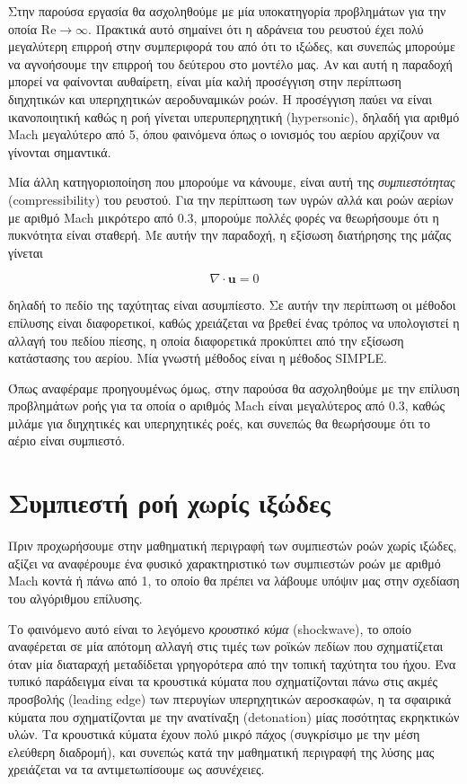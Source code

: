 Στην παρούσα εργασία θα ασχοληθούμε με μία υποκατηγορία προβλημάτων για την οποία $\mathrm{Re} \to \infty$.
Πρακτικά αυτό σημαίνει ότι η αδράνεια του ρευστού έχει πολύ μεγαλύτερη επιρροή στην συμπεριφορά του από ότι το ιξώδες, και συνεπώς μπορούμε να αγνοήσουμε την επιρροή του δεύτερου στο μοντέλο μας.
Αν και αυτή η παραδοχή μπορεί να φαίνονται αυθαίρετη, είναι μία καλή προσέγγιση στην περίπτωση διηχητικών και υπερηχητικών αεροδυναμικών ροών.
Η προσέγγιση παύει να είναι ικανοποιητική καθώς η ροή γίνεται υπερυπερηχητική (hypersonic), δηλαδή για αριθμό Mach μεγαλύτερο από 5, όπου φαινόμενα όπως ο ιονισμός του αερίου αρχίζουν να γίνονται σημαντικά.

Μία άλλη κατηγοριοποίηση που μπορούμε να κάνουμε, είναι αυτή της \emph{συμπιεστότητας} (compressibility) του ρευστού.
Για την περίπτωση των υγρών αλλά και ροών αερίων με αριθμό Mach μικρότερο από 0.3, μπορούμε πολλές φορές να θεωρήσουμε ότι η πυκνότητα είναι σταθερή.
Με αυτήν την παραδοχή, η εξίσωση διατήρησης της μάζας γίνεται

\begin{equation*}
    \nabla \cdot \mathbf{u} = 0
\end{equation*}

δηλαδή το πεδίο της ταχύτητας είναι ασυμπίεστο.
Σε αυτήν την περίπτωση οι μέθοδοι επίλυσης είναι διαφορετικοί, καθώς χρειάζεται να βρεθεί ένας τρόπος να υπολογιστεί η αλλαγή του πεδίου πίεσης, η οποία διαφορετικά προκύπτει από την εξίσωση κατάστασης του αερίου.
Μία γνωστή μέθοδος είναι η μέθοδος SIMPLE.

Όπως αναφέραμε προηγουμένως όμως, στην παρούσα θα ασχοληθούμε με την επίλυση προβλημάτων ροής για τα οποία ο αριθμός Mach είναι μεγαλύτερος από 0.3, καθώς μιλάμε για διηχητικές και υπερηχητικές ροές, και συνεπώς θα θεωρήσουμε ότι το αέριο είναι συμπιεστό.

\section{Συμπιεστή ροή χωρίς ιξώδες}

Πριν προχωρήσουμε στην μαθηματική περιγραφή των συμπιεστών ροών χωρίς ιξώδες, αξίζει να αναφέρουμε ένα φυσικό χαρακτηριστικό των συμπιεστών ροών με αριθμό Mach κοντά ή πάνω από 1, το οποίο θα πρέπει να λάβουμε υπόψιν μας στην σχεδίαση του αλγόριθμου επίλυσης.

Το φαινόμενο αυτό είναι το λεγόμενο \emph{κρουστικό κύμα} (shockwave), το οποίο αναφέρεται σε μία απότομη αλλαγή στις τιμές των ροϊκών πεδίων που σχηματίζεται όταν μία διαταραχή μεταδίδεται γρηγορότερα από την τοπική ταχύτητα του ήχου.
Ένα τυπικό παράδειγμα είναι τα κρουστικά κύματα που σχηματίζονται πάνω στις ακμές προσβολής (leading edge) των πτερυγίων υπερηχητικών αεροσκαφών, η τα σφαιρικά κύματα που σχηματίζονται με την ανατίναξη (detonation) μίας ποσότητας εκρηκτικών υλών.
Τα κρουστικά κύματα έχουν πολύ μικρό πάχος (συγκρίσιμο με την μέση ελεύθερη διαδρομή), και συνεπώς κατά την μαθηματική περιγραφή της λύσης μας χρειάζεται να τα αντιμετωπίσουμε ως ασυνέχειες.

